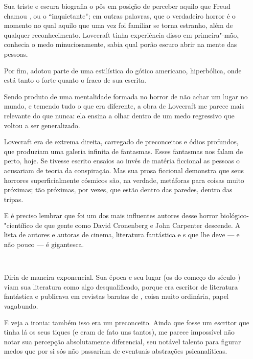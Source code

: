 \begin{changemargin}
Sua triste e escura biografia o pôs em posição de perceber aquilo que Freud chamou {}, ou o “inquietante”; em outras palavras, que o verdadeiro horror é o momento no qual aquilo que uma vez foi familiar se torna estranho, além de qualquer reconhecimento. Lovecraft tinha experiência disso em primeira"-mão, conhecia o medo minuciosamente, sabia qual porão escuro abrir na mente das pessoas.

Por fim, adotou parte de uma estilística do gótico americano, hiperbólica, onde está tanto o forte quanto o fraco de sua escrita.

\bigskip


Sendo produto de uma mentalidade formada no horror de não achar um lugar no mundo, e temendo tudo o que era diferente, a obra de Lovecraft me parece mais relevante do que nunca: ela ensina a olhar dentro de um medo regressivo que voltou a ser generalizado. 

Lovecraft era de extrema direita, carregado de preconceitos e ódios profundos, que produziam uma galeria infinita de fantasmas. Esses fantasmas nos falam de perto, hoje. Se tivesse escrito ensaios ao invés de matéria ficcional as pessoas o acusariam de teoria da conspiração. Mas sua prosa ficcional demonstra que seus horrores superficialmente cósmicos são, na verdade, metáforas para coisas muito próximas; tão próximas, por vezes, que estão dentro das paredes, dentro das tripas. 

E é preciso lembrar que foi um dos mais influentes autores desse horror biológico-"científico de que gente como David Cronenberg e John Carpenter descende. A lista de autores e autoras de cinema, literatura fantástica e s que lhe deve — e não pouco — é gigantesca. 

\bigskip 
\pagebreak


Diria de maneira exponencial. Sua época e seu lugar (os  do começo do século ) viam sua literatura como algo desqualificado, porque era escritor de literatura fantástica e publicava em revistas baratas de {}, coisa muito ordinária, papel vagabundo. 

E veja a ironia: também isso era um preconceito. Ainda que fosse um escritor que tinha lá os seus tiques (e eram de fato uns tantos), me parece impossível não notar sua percepção absolutamente diferencial, seu notável talento para figurar medos que por si sós não passariam de eventuais abstrações psicanalíticas. 


\end{changemargin}
